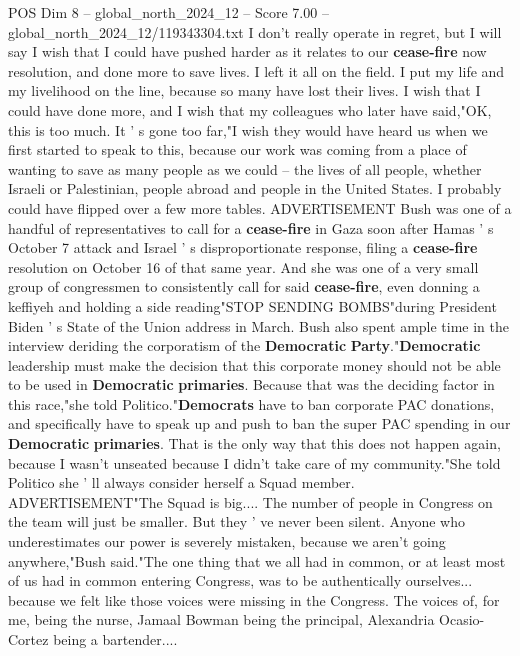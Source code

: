 \begin{textsample}{POS Dim 8 – global\_north\_2024\_12 – Score 7.00 – global\_north\_2024\_12/119343304.txt}  \label{ex:f8_pos_342}
I don't really operate in regret, but I will say I wish that I could have pushed harder as it relates to our \textbf{cease-fire} now resolution, and done more to save lives.
I left it all on the field.
I put my life and my livelihood on the line, because so many have lost their lives.
I wish that I could have done more, and I wish that my colleagues who later have said,"OK, this is too much.
It ' s gone too far,"I wish they would have heard us when we first started to speak to this, because our work was coming from a place of wanting to save as many people as we could -- the lives of all people, whether Israeli or Palestinian, people abroad and people in the United States.
I probably could have flipped over a few more tables.
ADVERTISEMENT Bush was one of a handful of representatives to call for a \textbf{cease-fire} in Gaza soon after Hamas ' s October 7 attack and Israel ' s disproportionate response, filing a \textbf{cease-fire} resolution on October 16 of that same year.
And she was one of a very small group of congressmen to consistently call for said \textbf{cease-fire}, even donning a keffiyeh and holding a side reading"STOP SENDING BOMBS"during President Biden ' s State of the Union address in March.
Bush also spent ample time in the interview deriding the corporatism of the \textbf{Democratic} \textbf{Party}."\textbf{Democratic} leadership must make the decision that this corporate money should not be able to be used in \textbf{Democratic} \textbf{primaries}.
Because that was the deciding factor in this race,"she told Politico."\textbf{Democrats} have to ban corporate PAC donations, and specifically have to speak up and push to ban the super PAC spending in our \textbf{Democratic} \textbf{primaries}.
That is the only way that this does not happen again, because I wasn't unseated because I didn't take care of my community."She told Politico she ' ll always consider herself a Squad member.
ADVERTISEMENT"The Squad is big....
The number of people in Congress on the team will just be smaller.
But they ' ve never been silent.
Anyone who underestimates our power is severely mistaken, because we aren't going anywhere,"Bush said."The one thing that we all had in common, or at least most of us had in common entering Congress, was to be authentically ourselves... because we felt like those voices were missing in the Congress.
The voices of, for me, being the nurse, Jamaal Bowman being the principal, Alexandria Ocasio-Cortez being a bartender....

\end{textsample}
